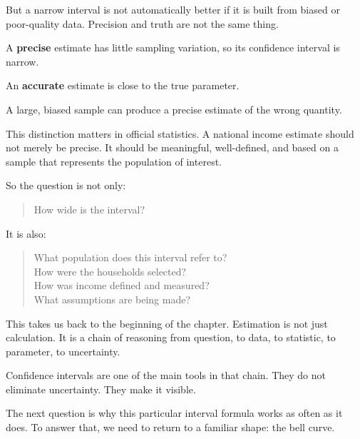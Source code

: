 \documentclass[
  letterpaper,
  DIV=11,
  numbers=noendperiod]{scrreprt}
\begin{document}
But a narrow interval is not automatically better if it is built from
biased or poor-quality data. Precision and truth are not the same thing.

\begin{tcolorbox}[enhanced jigsaw, arc=.35mm, bottomrule=.15mm, bottomtitle=1mm, breakable, colback=white, colbacktitle=quarto-callout-note-color!10!white, colframe=quarto-callout-note-color-frame, coltitle=black, left=2mm, leftrule=.75mm, opacityback=0, opacitybacktitle=0.6, rightrule=.15mm, title=\textcolor{quarto-callout-note-color}{\faInfo}\hspace{0.5em}{Precision and accuracy}, titlerule=0mm, toprule=.15mm, toptitle=1mm]

A \textbf{precise} estimate has little sampling variation, so its
confidence interval is narrow.

An \textbf{accurate} estimate is close to the true parameter.

A large, biased sample can produce a precise estimate of the wrong
quantity.

\end{tcolorbox}

This distinction matters in official statistics. A national income
estimate should not merely be precise. It should be meaningful,
well-defined, and based on a sample that represents the population of
interest.

So the question is not only:

\begin{quote}
How wide is the interval?
\end{quote}

It is also:

\begin{quote}
What population does this interval refer to?\\
How were the households selected?\\
How was income defined and measured?\\
What assumptions are being made?
\end{quote}

This takes us back to the beginning of the chapter. Estimation is not
just calculation. It is a chain of reasoning from question, to data, to
statistic, to parameter, to uncertainty.

Confidence intervals are one of the main tools in that chain. They do
not eliminate uncertainty. They make it visible.

The next question is why this particular interval formula works as often
as it does. To answer that, we need to return to a familiar shape: the
bell curve.
\end{document}
